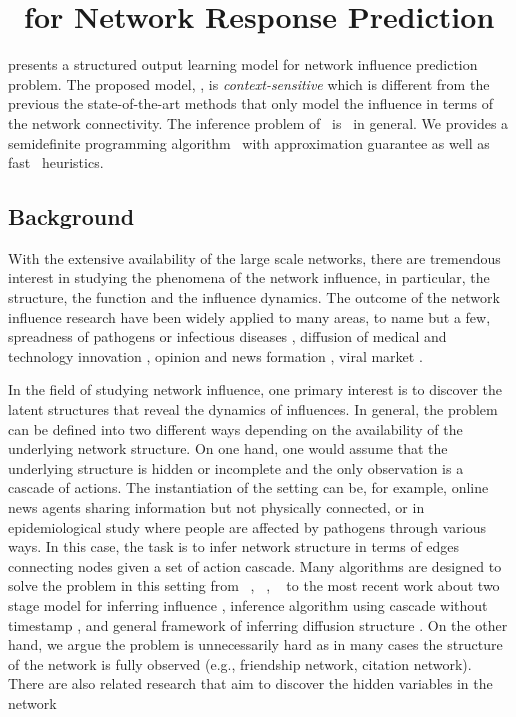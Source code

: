 {%
%
\section{\spin\ for Network Response Prediction} \label{sc_su14b}

 presents a structured output learning model for network influence prediction problem.
The proposed model, \spin, is \textit{context-sensitive} which is different from the previous the state-of-the-art methods that only model the influence in terms of the network connectivity.
The inference problem of \spin\ is \nphard\ in general.
We provides a semidefinite programming algorithm \sdp\ with approximation guarantee as well as fast \greedy\ heuristics.

\subsection{Background}

With the extensive availability of the large scale networks, there are tremendous interest in studying the phenomena of the network influence, in particular, the structure, the function and the influence dynamics. 
The outcome of the network influence research have been widely applied to many areas, to name but a few, spreadness of pathogens or infectious diseases \citep{Hethcote00the,Anderson02infectious}, diffusion of medical and technology innovation \citep{Strang98diffusion,Rogers03the}, opinion and news formation \citep{Adar04implicit,Gruhl04information,Adar05tracking,Leskovec07cascading,Nowell08tracing,Leskovec09meme}, viral market \citep{Domingos01mining,Kempe03maximizing,Liben-Nowell03the}.

In the field of studying network influence, one primary interest is to discover the latent structures that reveal the dynamics of influences.
In general, the problem can be defined into two different ways depending on the availability of the underlying network structure.
On one hand, one would assume that the underlying structure is hidden or incomplete and the only observation is a cascade of actions.
The instantiation of the setting can be, for example, online news agents sharing information but not physically connected, or in epidemiological study where people are affected by pathogens through various ways.
In this case, the task is to infer network structure in terms of edges connecting nodes given a set of action cascade.
Many algorithms are designed to solve the problem in this setting from \netinf\ \citep{GomezRodriguez10inferring}, \netrate\ \citep{Rodrigues11unconvering}, \ \citep{Du12learning} to the most recent work about two stage model for inferring influence \citep{Du14influence}, inference algorithm using cascade without timestamp \citep{Amin14learning}, and general framework of inferring diffusion structure \citep{Daneshmand14estimating}.
On the other hand, we argue the problem is unnecessarily hard as in many cases the structure of the network is fully observed (e.g., friendship network, citation network).
There are also related research that aim to discover the hidden variables in the network \citep{Lovrek08prediction,Goyal10learning}

}
